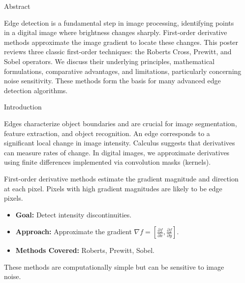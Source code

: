 \documentclass[final]{beamer}
\newlength{\sepwidth}
\newlength{\colwidth}
\newcommand{\separatorcolumn}{\begin{column}{\sepwidth}\end{column}}
\begin{document}
\begin{frame}[t] %
\begin{columns}[t] %

\separatorcolumn %

\begin{column}{\colwidth}

  \begin{block}{Abstract}
  
    Edge detection is a fundamental step in image processing, identifying points in a digital image where brightness changes sharply. First-order derivative methods approximate the image gradient to locate these changes. This poster reviews three classic first-order techniques: the Roberts Cross, Prewitt, and Sobel operators. We discuss their underlying principles, mathematical formulations, comparative advantages, and limitations, particularly concerning noise sensitivity. These methods form the basis for many advanced edge detection algorithms.
  \end{block}

  \begin{block}{Introduction}
  
    Edges characterize object boundaries and are crucial for image segmentation, feature extraction, and object recognition. An edge corresponds to a significant local change in image intensity. Calculus suggests that derivatives can measure rates of change. In digital images, we approximate derivatives using finite differences implemented via convolution masks (kernels).

    First-order derivative methods estimate the gradient magnitude and direction at each pixel. Pixels with high gradient magnitudes are likely to be edge pixels.
    \begin{itemize}
        \item \textbf{Goal:} Detect intensity discontinuities.
        \item \textbf{Approach:} Approximate the gradient $\nabla f = [\frac{\partial f}{\partial x}, \frac{\partial f}{\partial y}]$.
        \item \textbf{Methods Covered:} Roberts, Prewitt, Sobel.
    \end{itemize}
    These methods are computationally simple but can be sensitive to image noise.
  \end{block}


\end{column}
\end{columns}
\end{frame}
\end{document}
